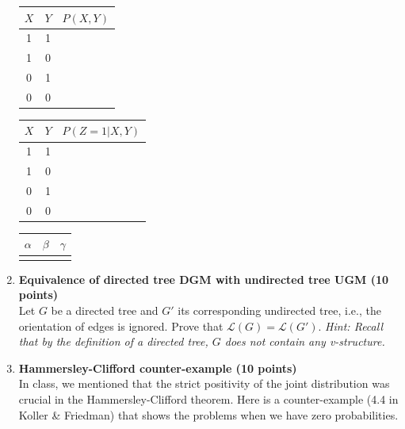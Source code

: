 \documentclass[12pt]{article}
\newcommand{\1}{{\bf 1}}
\begin{document}
\begin{enumerate}
\begin{center}
    \begin{tabular}{|c|c|c|}
        \hline
        $X$ & $Y$ & $P(X,Y)$ \\
        \hline
        1 & 1 &  \\
        \hline
        1 & 0 &  \\
        \hline
        0 & 1 &  \\
        \hline
        0 & 0 &  \\
        \hline
    \end{tabular}
    \hspace{5mm}
    \begin{tabular}{|c|c|c|}
        \hline
        $X$ & $Y$ & $P(Z=1 | X,Y)$ \\
        \hline
        1 & 1 &  \\
        \hline
        1 & 0 &  \\
        \hline
        0 & 1 &  \\
        \hline
        0 & 0 &  \\
        \hline
    \end{tabular}
    \hspace{5mm}
    \begin{tabular}{|c|c|c|}
        \hline
        $\alpha$ & $\beta$ & $\gamma$ \\
        \hline
        \hspace{9mm} & \hspace{9mm} & \hspace{9mm} \\
        \hline
    \end{tabular}
\end{center}


\item {\bf Equivalence of directed tree DGM with undirected tree UGM (10 points) } \\
Let $G$ be a directed tree and $G'$ its corresponding undirected tree, i.e., the orientation of edges is ignored. Prove that $\mathcal{L}(G)=\mathcal{L}(G')$. \textit{Hint: Recall that by the definition of a directed tree, $G$ does not contain any v-structure.}

\vspace{0.2cm}

\item {\bf Hammersley-Clifford counter-example (10 points)} \\
In class, we mentioned that the strict positivity of the joint distribution was crucial in the Hammersley-Clifford theorem. Here is a counter-example (4.4 in Koller \& Friedman) that shows the problems when we have zero probabilities.


\end{enumerate}
\end{document}
